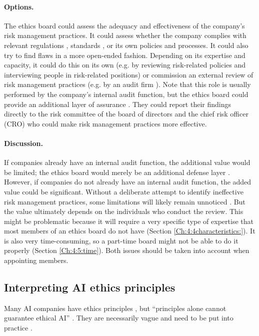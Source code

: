 \documentclass{article}
\begin{document}
\paragraph{Options.} The ethics board could assess the adequacy and effectiveness of the company’s risk management practices. It could assess whether the company complies with relevant regulations \cite{schuett2022risk}, standards \cite{nist2023artificial, iso23894_2023}, or its own policies and processes. It could also try to find flaws in a more open-ended fashion. Depending on its expertise and capacity, it could do this on its own (e.g. by reviewing risk-related policies and interviewing people in risk-related positions) or commission an external review of risk management practices (e.g. by an audit firm \cite{mokander2022operationalising}). Note that this role is usually performed by the company’s internal audit function, but the ethics board could provide an additional layer of assurance \cite{schuett2022lines}. They could report their findings directly to the risk committee of the board of directors and the chief risk officer (CRO) who could make risk management practices more effective.

\paragraph{Discussion.} If companies already have an internal audit function, the additional value would be limited; the ethics board would merely be an additional defense layer \cite{schuett2022lines}. However, if companies do not already have an internal audit function, the added value could be significant. Without a deliberate attempt to identify ineffective risk management practices, some limitations will likely remain unnoticed \cite{schuett2022lines}. But the value ultimately depends on the individuals who conduct the review. This might be problematic because it will require a very specific type of expertise that most members of an ethics board do not have (Section \ref{Ch:4:4characteristics:}). It is also very time-consuming, so a part-time board might not be able to do it properly (Section \ref{Ch:4:5:time}). Both issues should be taken into account when appointing members.

\subsection{Interpreting AI ethics principles}\label{Ch:2:5:interpreting}

Many AI companies have ethics principles \cite{jobin2019global, hagendorff2020ethics}, but “principles alone cannot guarantee ethical AI” \cite{mittelstadt2019principles}. They are necessarily vague and need to be put into practice \cite{morley2020initial, zhou2022ai, seger2022defence}.
\end{document}
